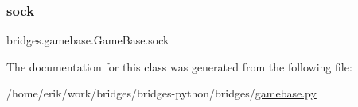 \mbox{\label{classbridges_1_1gamebase_1_1_game_base_a4a7fe2d524c02966900937bddea195e7}} 
\subsubsection{\texorpdfstring{sock}{sock}}
{\footnotesize\ttfamily bridges.\+gamebase.\+Game\+Base.\+sock}



The documentation for this class was generated from the following file\+:\begin{DoxyCompactItemize}
\item 
/home/erik/work/bridges/bridges-\/python/bridges/\hyperlink{gamebase_8py}{gamebase.\+py}\end{DoxyCompactItemize}
